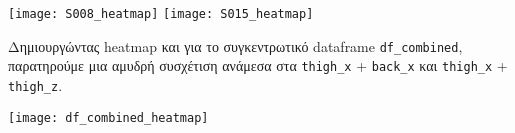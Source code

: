         \begin{multicols}{2} \centering
            \noindent\texttt{[image: S008\_heatmap]}
            \texttt{[image: S015\_heatmap]}
        \end{multicols}

        Δημιουργώντας heatmap και για το συγκεντρωτικό dataframe \verb|df_combined|, παρατηρούμε μια  αμυδρή συσχέτιση
        ανάμεσα στα \verb|thigh_x| + \verb|back_x| και \verb|thigh_x| + \verb|thigh_z|.

        \vspace{-5pt}
        \begin{center}
            \texttt{[image: df\_combined\_heatmap]}
        \end{center}

\pagebreak